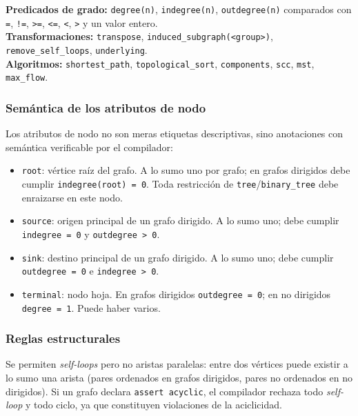 \documentclass[11pt,a4paper]{article}
\newcommand{\code}[1]{\texttt{#1}}
\begin{document}
\noindent\textbf{Predicados de grado:} \code{degree(n)}, \code{indegree(n)},
\code{outdegree(n)} comparados con \code{=}, \code{!=}, \code{>=}, \code{<=},
\code{<}, \code{>} y un valor entero.\\
\textbf{Transformaciones:} \code{transpose}, \code{induced\_subgraph(<group>)},
\code{remove\_self\_loops}, \code{underlying}.\\
\textbf{Algoritmos:} \code{shortest\_path}, \code{topological\_sort},
\code{components}, \code{scc}, \code{mst}, \code{max\_flow}.

\subsubsection{Semántica de los atributos de nodo}

Los atributos de nodo no son meras etiquetas descriptivas, sino anotaciones con
semántica verificable por el compilador:

\begin{itemize}[noitemsep]
  \item \code{root}: vértice raíz del grafo. A lo sumo uno por grafo; en grafos
        dirigidos debe cumplir \code{indegree(root) = 0}. Toda restricción de
        \code{tree}/\code{binary\_tree} debe enraizarse en este nodo.
  \item \code{source}: origen principal de un grafo dirigido. A lo sumo uno;
        debe cumplir \code{indegree = 0} y \code{outdegree > 0}.
  \item \code{sink}: destino principal de un grafo dirigido. A lo sumo uno;
        debe cumplir \code{outdegree = 0} e \code{indegree > 0}.
  \item \code{terminal}: nodo hoja. En grafos dirigidos
        \code{outdegree = 0}; en no dirigidos \code{degree = 1}. Puede haber
        varios.
\end{itemize}

\subsubsection{Reglas estructurales}

Se permiten \emph{self-loops} pero no aristas paralelas: entre dos vértices
puede existir a lo sumo una arista (pares ordenados en grafos dirigidos, pares
no ordenados en no dirigidos). Si un grafo declara \code{assert acyclic},
el compilador rechaza todo \emph{self-loop} y todo ciclo, ya que constituyen
violaciones de la aciclicidad.

\end{document}
